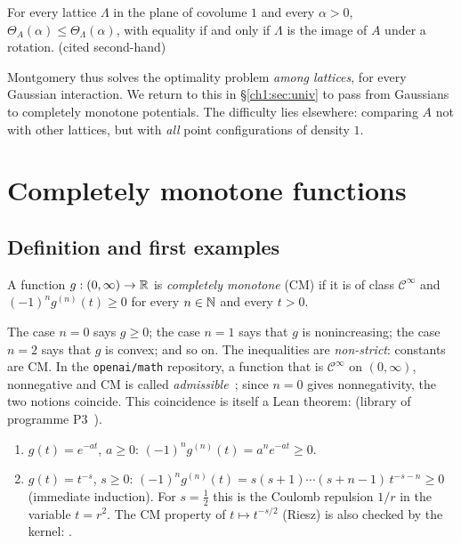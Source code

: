 \begin{theorem}[Montgomery, 1988]\label{ch1:thm:montgomery}
For every lattice $\Lambda$ in the plane of covolume $1$ and every $\alpha>0$, $\Theta_A(\alpha)\le\Theta_\Lambda(\alpha)$, with equality if and only if $\Lambda$ is
the image of $A$ under a rotation. \tierL{} (cited second-hand)~\cite{montgomery}
\end{theorem}

Montgomery thus solves the optimality problem \emph{among lattices}, for every Gaussian interaction. We return to this in §\ref{ch1:sec:univ}
to pass from Gaussians to completely monotone potentials. The difficulty lies elsewhere: comparing $A$ not with other lattices, but with
\emph{all} point configurations of density $1$.

\section{Completely monotone functions}
\label{ch1:sec:cm}

\subsection{Definition and first examples}

\begin{definition}\label{ch1:def:cm}
A function $g:(0,\infty)\to\mathbb{R}$ is \emph{completely monotone} (CM) if it is of class $\mathcal C^\infty$ and
$(-1)^n g^{(n)}(t)\ge0$ for every $n\in\mathbb{N}$ and every $t>0$.
\end{definition}

The case $n=0$ says $g\ge0$; the case $n=1$ says that $g$ is nonincreasing; the case $n=2$ says that $g$ is convex; and so on.
The inequalities are \emph{non-strict}: constants are CM. In the \texttt{openai/math} repository, a function that is $\mathcal C^\infty$ on $(0,\infty)$,
nonnegative and CM is called \emph{admissible}~\cite{oai}; since $n=0$ gives nonnegativity, the two notions coincide. This coincidence is
itself a Lean theorem:  \tierA{} (library of programme P3~\cite{p3}).

\begin{example}\label{ch1:ex:exemples}
\begin{enumerate}
\item $g(t)=e^{-at}$, $a\ge0$: $(-1)^ng^{(n)}(t)=a^ne^{-at}\ge0$. \tierC{}
\item $g(t)=t^{-s}$, $s\ge0$: $(-1)^ng^{(n)}(t)=s(s+1)\cdots(s+n-1)\,t^{-s-n}\ge0$ (immediate induction). \tierC{}
For $s=\frac12$ this is the Coulomb repulsion $1/r$ in the variable $t=r^2$. The CM property of $t\mapsto t^{-s/2}$ (Riesz) is also
checked by the kernel:  \tierA{}.
\end{enumerate}
\end{example}

